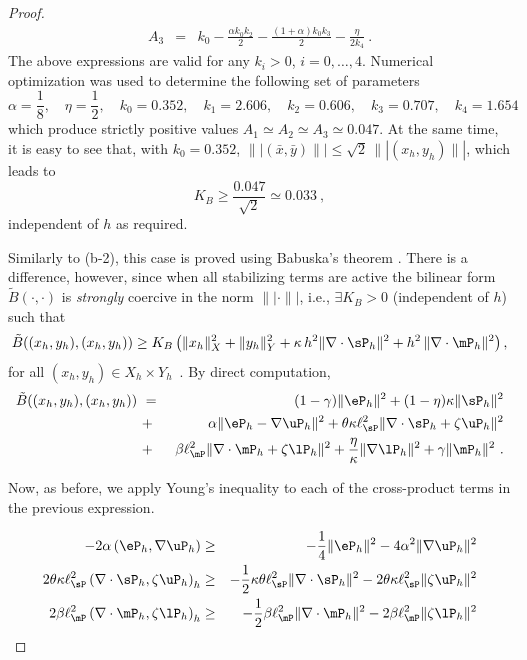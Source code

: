 \begin{proof}
\begin{eqnarray*}
 A_3 & = & k_0 - \frac{\alpha k_0 k_2}{2} - \frac{(1+\alpha)k_0k_3}{2} - \frac{\eta}{2 k_4}~.
 \end{eqnarray*}
 The above expressions are valid for any $k_i>0$, $i=0,\ldots,4$. Numerical optimization was used to determine the following set of parameters
 $$
 \alpha=\frac18,\quad \eta=\frac12,\quad k_0=0.352, \quad k_1=2.606, \quad
 k_2=0.606,\quad k_3=0.707, \quad k_4=1.654
 $$
 which produce strictly positive values $A_1 \simeq A_2 \simeq A_3 \simeq 0.047$.  At the same time, it is easy to see that, with $k_0=0.352$, $\||(\bar{x},\bar{y})\||\leq \sqrt{2}\,\||(x_h,y_h)\||$, which leads to
 $$
 K_B \geq \frac{0.047}{\sqrt{2}} \simeq 0.033~,
 $$
 independent of $h$ as required.
 
 \bigskip
 
  Similarly to (b-2), this case is proved using Babuska's theorem \cite{Demkowicz2006}. There is a difference, however, since when all stabilizing terms are active the bilinear form $\tilde{B}(\cdot,\cdot)$ is {\em strongly} coercive in the norm $\||\cdot\||$, i.e., $\exists K_B > 0$ (independent of $h$) such that
	\begin{equation}
		\tilde{B}((x_h,y_h),(x_h,y_h))\geq K_B \left ( 
		\|x_h\|_X^2 + \|y_h\|_Y^2 + \kappa\,h^2 \|\nabla \cdot \sP_h \|^2
		+ h^2\,\|\nabla \cdot \mP_h \|^2\right ),
	\end{equation}
	for all $ (x_h,y_h)\in X_h\times Y_h$~.
	By direct computation, 
	\begin{eqnarray}
		\tilde{B}((x_h,y_h),(x_h,y_h)) ~&=&~ (1-\gamma) \|\eP_h\|^2 + (1-\eta)\kappa \|\sP_h\|^2 \nonumber \\
		~&+&~ \alpha \|\eP_h-\nabla \uP_h\|^2 + \theta \kappa \ell_{\sP}^2 \|\nabla \cdot \sP_h + \zeta \uP_h\|^2 \nonumber \\
		~&+&~ \beta \ell_{\mP}^2 \| \nabla \cdot \mP_h + \zeta \lP_h \|^2
		+ \frac{\eta}{\kappa} \|\nabla \lP_h\|^2 + \gamma \|\mP_h\|^2~.
	\end{eqnarray}
	
	Now, as before, we apply Young's inequality to each of the cross-product terms in the previous expression.
	
	\begin{eqnarray}
		-2\alpha \left (\eP_h,\nabla \uP_h \right ) & \geq & -\frac14 \|\eP_h\|^2 - 4\alpha^2 \|\nabla \uP_h \|^2 \\
		2\theta\kappa \ell_{\sP}^2\left ( \nabla \cdot \sP_h, \zeta \uP_h \right )_h& \geq & - \frac12 \kappa \theta \ell_{\sP}^2 \|\nabla\cdot \sP_h\|^2 - {2\theta\kappa\ell_{\sP}^2}\|\zeta \uP_h\|^2\\
		2 \beta \ell_{\mP}^2\left ( \nabla \cdot \mP_h, \zeta \lP_h \right )_h& \geq & - \frac12 {\beta} \ell_{\mP}^2 \|\nabla\cdot \mP_h\|^2 - {2\beta\ell_{\mP}^2}\|\zeta \lP_h\|^2
	\end{eqnarray}
	

\end{proof}
